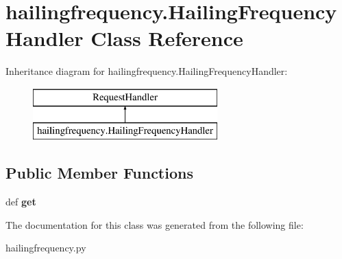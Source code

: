 \hypertarget{classhailingfrequency_1_1_hailing_frequency_handler}{\section{hailingfrequency.\-Hailing\-Frequency\-Handler Class Reference}
\label{classhailingfrequency_1_1_hailing_frequency_handler}
}
Inheritance diagram for hailingfrequency.\-Hailing\-Frequency\-Handler\-:\begin{figure}[H]
\begin{center}
\leavevmode
\includegraphics[height=2.000000cm]{classhailingfrequency_1_1_hailing_frequency_handler}
\end{center}
\end{figure}
\subsection*{Public Member Functions}
\begin{DoxyCompactItemize}
\item 
\hypertarget{classhailingfrequency_1_1_hailing_frequency_handler_a0bda90585d0261bea07e6db3077d6f79}{def {\bfseries get}}\label{classhailingfrequency_1_1_hailing_frequency_handler_a0bda90585d0261bea07e6db3077d6f79}

\end{DoxyCompactItemize}


The documentation for this class was generated from the following file\-:\begin{DoxyCompactItemize}
\item 
hailingfrequency.\-py\end{DoxyCompactItemize}
